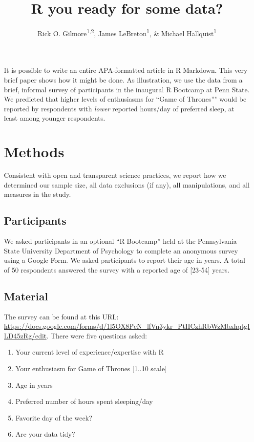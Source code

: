 \documentclass[english,man]{apa6}
\title{R you ready for some data?}
\author{Rick O. Gilmore\textsuperscript{1,2}, James LeBreton\textsuperscript{1}, \& Michael Hallquist\textsuperscript{1}}
\affiliation{
    \vspace{0.5cm}
          \textsuperscript{1} The Pennsylvania State University\\
          \textsuperscript{2} Databrary.org  }
\providecommand{\tightlist}{%
  \setlength{\itemsep}{0pt}\setlength{\parskip}{0pt}}
\theoremstyle{definition}
\theoremstyle{definition}
\theoremstyle{remark}
\begin{document}
\maketitle

\setcounter{secnumdepth}{0}



It is possible to write an entire APA-formatted article in R Markdown.
This very brief paper shows how it might be done. As illustration, we
use the data from a brief, informal survey of participants in the
inaugural R Bootcamp at Penn State. We predicted that higher levels of
enthusiasms for \enquote{Game of Thrones}" would be reported by
respondents with \emph{lower} reported hours/day of preferred sleep, at
least among younger respondents.

\section{Methods}\label{methods}

Consistent with open and transparent science practices, we report how we
determined our sample size, all data exclusions (if any), all
manipulations, and all measures in the study.

\subsection{Participants}\label{participants}

We asked participants in an optional \enquote{R Bootcamp} held at the
Pennsylvania State University Department of Psychology to complete an
anonymous survey using a Google Form. We asked participants to report
their age in years. A total of 50 respondents answered the survey with a
reported age of {[}23-54{]} years.

\subsection{Material}\label{material}

The survey can be found at this URL:
\url{https://docs.google.com/forms/d/1l5OX8PcN_lfVn3ykr_PtHCzhRbWzMbxhqtgILD45zRg/edit}.
There were five questions asked:

\begin{enumerate}
\def\labelenumi{\arabic{enumi}.}
\tightlist
\item
  Your current level of experience/expertise with R
\item
  Your enthusiasm for Game of Thrones {[}1..10 scale{]}
\item
  Age in years
\item
  Preferred number of hours spent sleeping/day
\item
  Favorite day of the week?
\item
  Are your data tidy?
\end{enumerate}
\end{document}
